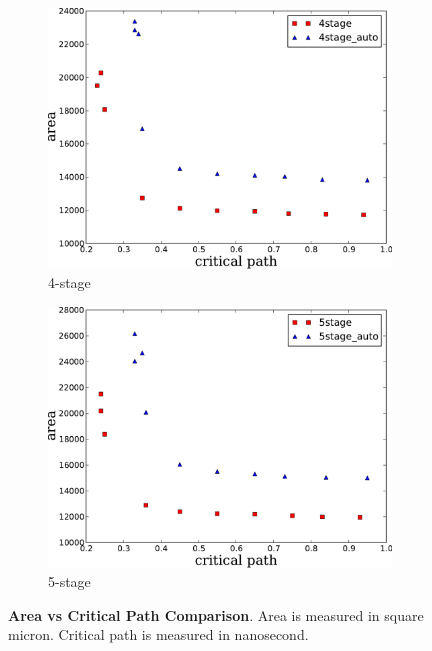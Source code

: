 \begin{figure}[htb]
\begin{subfigure}[t]{0.47\textwidth}
  \label{fig:3stage}
  \vspace{20pt}
  \end{subfigure}
  \hfill
  \begin{subfigure}[t]{0.47\textwidth}
  \centering
  \includegraphics[width=\textwidth]{figures/4stage.pdf}
  \caption{4-stage}
  \label{fig:4stage}
  \end{subfigure}
  \hfill
  \begin{subfigure}[t]{0.47\textwidth}
  \centering
  \includegraphics[width=\textwidth]{figures/5stage.pdf}
  \caption{5-stage}
  \label{fig:5stage}
  \end{subfigure}
\caption{{\bf Area vs Critical Path Comparison}. Area is measured in
  square micron. Critical path is measured in nanosecond.}
\label{fig:area-time}
\end{figure}
